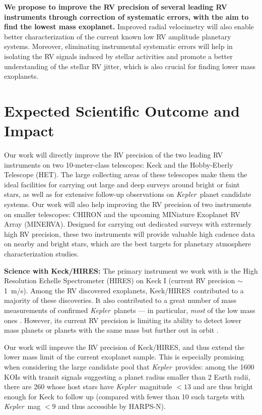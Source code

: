 \documentclass[12pt]{article}
\def\mps{m/s}
\def\kepler{{\it Kepler}}
\def\minerva{MINERVA}
\def\keck{Keck/HIRES}
\begin{document}
\textbf{We propose to improve the RV precision of several leading RV
  instruments through correction of systematic errors, with the aim to
  find the lowest mass exoplanet.} Improved radial velocimetry will
also enable better characterization of the current known low RV
amplitude planetary systems. Moreover, eliminating instrumental
systematic errors will help in isolating the RV signals induced by
stellar activities and promote a better understanding of the stellar
RV jitter, which is also crucial for finding lower mass exoplanets.


\vspace{-3pt}
\section{Expected Scientific Outcome and Impact}

Our work will directly improve the RV precision of the two leading RV
instruments on two 10-meter-class telescopes: Keck and the
Hobby-Eberly Telescope (HET). The large collecting areas of these
telescopes make them the ideal facilities for carrying out large and
deep surveys around bright or faint stars, as well as for extensive
follow-up observations on \kepler\ planet candidate systems. Our work
will also help improving the RV precision of two instruments on
smaller telescopes: CHIRON and the upcoming MINiature Exoplanet RV
Array (\minerva). Designed for carrying out dedicated surveys with
extremely high RV precision, these two instruments will provide
valuable high cadence data on nearby and bright stars, which are the
best targets for planetary atmosphere characterization studies.

\textbf{Science with \keck: } The primary instrument we work with is
the High Resolution Echelle Spectrometer (HIRES) on Keck I (current RV
precision $\sim$1~\mps). Among the RV discovered exoplanets,
\keck\ contributed to a majority of these discoveries. It also
contributed to a great number of mass measurements of confirmed
\kepler\ planets --- in particular, \textit{most} of the low mass ones
\citep[e.g.,][]{gautier2012,gilliland2013,howard2013,marcy2014}. However,
its current RV precision is limiting its ability to detect lower mass
planets or planets with the same mass but further out in orbit
\citep[e.g.,][]{marcy2014}.

Our work will improve the RV precision of \keck, and thus extend the
lower mass limit of the current exoplanet sample. This is especially
promising when considering the large candidate pool that
\kepler\ provides: among the 1600 KOIs with transit signals suggesting
a planet radius smaller than 2 Earth radii, there are 260 whose host
stars have \kepler\ magnitude $< 13$ and are thus bright enough for
Keck to follow up (compared with fewer than 10 such targets with
\kepler\ mag $< 9$ and thus accessible by HARPS-N).
\end{document}
